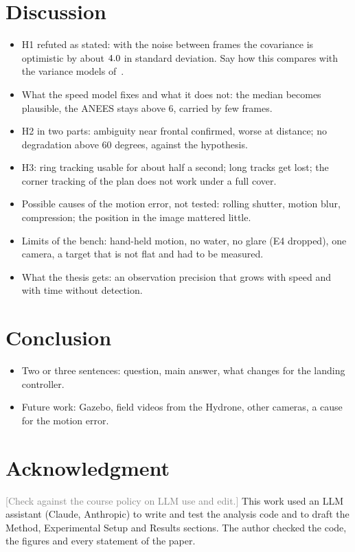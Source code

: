 \documentclass[conference]{IEEEtran}
\newcommand{\topic}[1]{\textcolor{gray}{[#1]}}
\newcommand{\topics}[1]{\begingroup\color{gray}\begin{itemize}#1\end{itemize}\endgroup}
\begin{document}
\begin{table}[t]
\caption{Marker error and consistency per condition. ANEES should be 6 and 95\% of the frames should
fall inside the $\chi^2_6$ interval. E1 is the fit set of the speed model.}
\label{tab:results}
\centering

\end{table}

\section{Discussion}
\topics{
\item H1 refuted as stated: with the noise between frames the covariance is optimistic by about $4.0$ in standard deviation. Say how this compares with the variance models of~\cite{adamek2023}.
\item What the speed model fixes and what it does not: the median becomes plausible, the ANEES stays above 6, carried by few frames.
\item H2 in two parts: ambiguity near frontal confirmed, worse at distance; no degradation above 60 degrees, against the hypothesis.
\item H3: ring tracking usable for about half a second; long tracks get lost; the corner tracking of the plan does not work under a full cover.
\item Possible causes of the motion error, not tested: rolling shutter, motion blur, compression; the position in the image mattered little.
\item Limits of the bench: hand-held motion, no water, no glare (E4 dropped), one camera, a target that is not flat and had to be measured.
\item What the thesis gets: an observation precision that grows with speed and with time without detection.
}

\section{Conclusion}
\topics{
\item Two or three sentences: question, main answer, what changes for the landing controller.
\item Future work: Gazebo, field videos from the Hydrone, other cameras, a cause for the motion error.
}

\section*{Acknowledgment}
\topic{Check against the course policy on LLM use and edit.} This work used an LLM assistant (Claude,
Anthropic) to write and test the analysis code and to draft the Method, Experimental Setup and Results
sections. The author checked the code, the figures and every statement of the paper.
\end{document}
